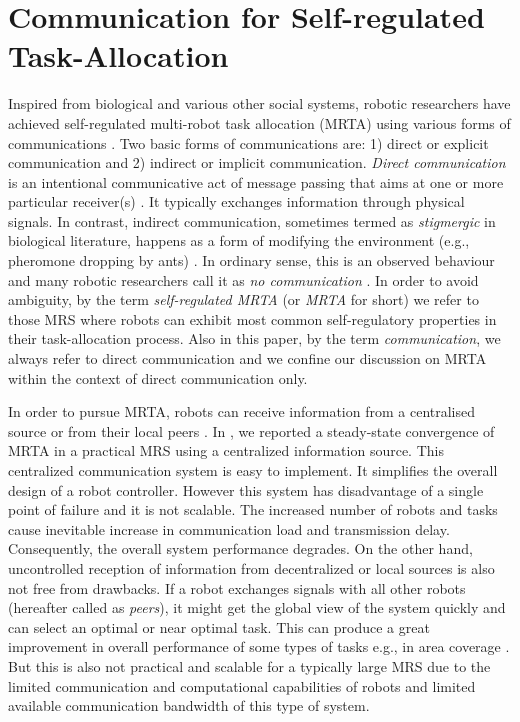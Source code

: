 \section{Communication for Self-regulated Task-Allocation}
Inspired from biological and various other social systems, robotic researchers have achieved self-regulated multi-robot task allocation (MRTA) using various forms of communications \cite{Bonabeau+1999,Labella}. Two basic forms of communications are: 1) direct or explicit communication and 2) indirect or implicit communication. {\em Direct communication} is an intentional communicative act of message passing that aims at one or more particular receiver(s) \cite{Mataric}. It typically exchanges information through physical signals. In contrast, indirect communication, sometimes termed as {\em stigmergic} in biological literature, happens as a form of modifying the environment (e.g., pheromone dropping by ants) \cite{Bonabeau+1999}. In ordinary sense, this is an observed behaviour and many robotic researchers call it as {\em no communication} \cite{Labella}. In order to avoid ambiguity,  by the term {\em self-regulated MRTA} (or {\em  MRTA} for short) we refer to those MRS where robots can  exhibit most common self-regulatory properties \cite{Bonabeau+1999} in their task-allocation process. Also in this paper,  by the term {\em communication}, we always refer to direct communication and we confine our discussion on MRTA within the context of direct communication only.

In order to pursue MRTA, robots can receive information from a centralised source \cite{Krieger} or from their local peers \cite{Agassounon}. In \cite{Sarker}, we reported a steady-state convergence of MRTA in a practical MRS using a centralized information source. This centralized communication system is easy to implement. It simplifies the overall design of a robot controller. However this system has disadvantage of a single point of failure and it is not scalable. The increased number of robots and tasks cause inevitable increase in communication load and transmission delay. Consequently, the overall system performance degrades. On the other hand, uncontrolled reception of information from decentralized or local sources is also not free from drawbacks. If a robot exchanges signals with all other robots (hereafter called as {\em peers}), it might get the global view of the system quickly and can select an optimal or near optimal task. This can produce a great improvement in overall performance of some types of tasks e.g., in area coverage \cite{Rutishauser}. But this is also not practical and scalable for a typically large MRS due to the limited communication and computational capabilities of robots and limited available communication bandwidth of this type of system.

